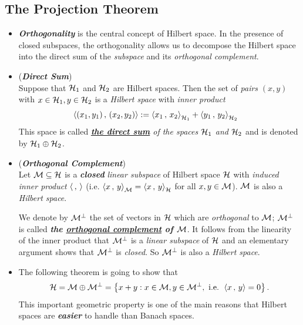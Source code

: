 \documentclass[11pt]{article}
\begin{document}
\subsection{The Projection Theorem}
\begin{itemize}
\item \begin{remark}
\emph{\textbf{Orthogonality}} is the central concept of Hilbert space. In the presence of closed subspaces, the orthogonality allows us to decompose the Hilbert space into the direct sum of the \emph{subspace} and its \emph{orthogonal complement}.
\end{remark}

\item \begin{definition} (\emph{\textbf{Direct Sum}})\\
Suppose that ${\mathcal H}_1$ and ${\mathcal H}_2$ are Hilbert spaces. Then the set of \emph{pairs} $(x, y)$ with $x \in {\mathcal H}_1, y \in {\mathcal H}_2$ is a \emph{Hilbert space} with \emph{inner
product}
\begin{align*}
\left\langle (x_1, y_1)\,,\, (x_2, y_2) \right\rangle &:= \left\langle x_1\,,\, x_2 \right\rangle_{{\mathcal H}_1} + \left\langle y_1\,,\, y_2 \right\rangle_{{\mathcal H}_2}
\end{align*}
This space is called \emph{\underline{\textbf{the direct sum}} of the spaces ${\mathcal H}_1$ and ${\mathcal H}_2$} and is denoted by ${\mathcal H}_1 \oplus {\mathcal H}_2$.
\end{definition}

\item \begin{definition} (\emph{\textbf{Orthogonal Complement}})\\
Let ${\mathcal M} \subseteq {\mathcal H}$ is a \emph{\textbf{closed}} \emph{linear subspace} of Hilbert space ${\mathcal H}$ with \emph{induced inner product} $\left\langle \,,\,  \right\rangle$ (i.e. $\left\langle x\,,\, y \right\rangle_{{\mathcal M}} = \left\langle x\,,\, y \right\rangle_{{\mathcal H}}$ for all $x, y \in {\mathcal M}$). ${\mathcal M}$ is also a \emph{Hilbert space}.

We denote by ${\mathcal M}^{\bot}$ the set of vectors in ${\mathcal H}$ which are \emph{orthogonal} to ${\mathcal M}$;  ${\mathcal M}^{\bot}$ is called \emph{\textbf{the \underline{orthogonal complement} of ${\mathcal M}$}}. It follows from the linearity of the inner product that ${\mathcal M}^{\bot}$ is a \emph{linear subspace} of ${\mathcal H}$ and an elementary argument shows that ${\mathcal M}^{\bot}$ is \emph{closed}. So ${\mathcal M}^{\bot}$ is also a \emph{Hilbert space}.
\end{definition}

\item \begin{remark}
The following theorem is going to show that 
\begin{align*}
{\mathcal H} = {\mathcal M} \oplus {\mathcal M}^{\bot} = \left\{x+y: x\in {\mathcal M}, y \in {\mathcal M}^{\bot}, \text{ i.e. }\left\langle x\,,\, y \right\rangle = 0\right\}.
\end{align*}
This important geometric property is one of the main reasons that Hilbert spaces are \emph{\textbf{easier}} to handle than Banach spaces.
\end{remark}


\end{itemize}
\end{document}
